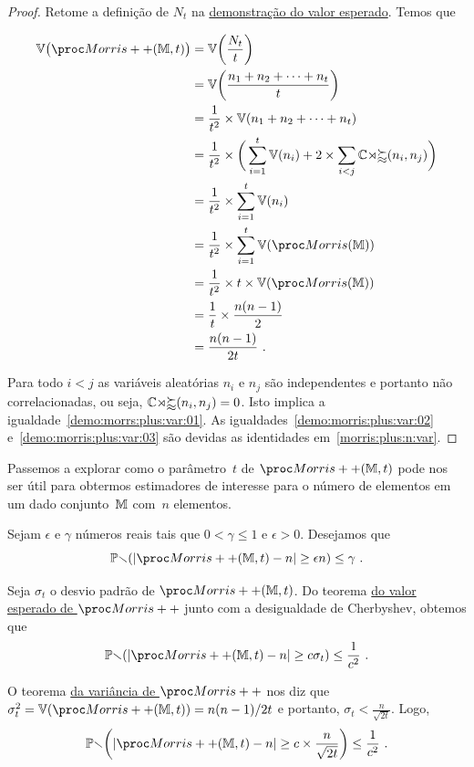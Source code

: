 \begin{proof}
  Retome a definição de $N_t$ na \hyperref[demo:morris:plus]{demonstração do valor esperado}. Temos que

  \begin{align}
    \Vbb\big(\Morrispp(\Mbb,t)\big) & = \Vbb\bigg(\frac{N_t}{t}\bigg) \nonumber\\
    & = \Vbb\bigg(\frac{n_1 + n_2 + \dots +n_t}{t} \bigg) \nonumber\\
    &= \frac{1}{t^2} \times \Vbb(n_1 + n_2 + \dots + n_t)  \nonumber\\
    &= \frac{1}{t^2} \times \bigg(\sum_{i=1}^t\Vbb(n_i) + 2\times \sum_{i<j}\Cov(n_i,n_j)\bigg)\\
    &= \frac{1}{t^2} \times \sum_{i=1}^t\Vbb(n_i) \label{demo:morrs:plus:var:01}\\
    &= \frac{1}{t^2} \times \sum_{i=1}^t\Vbb(\Morris(\Mbb)) \label{demo:morris:plus:var:02} \\
    &= \frac{1}{t^2} \times t \times \Vbb(\Morris(\Mbb)) \nonumber\\
    &= \frac{1}{t} \times \frac{n(n-1)}{2} \label{demo:morris:plus:var:03}\\
    &= \frac{n(n-1)}{2t}\ . \nonumber
  \end{align}
  
  Para todo $i < j$ as variáveis aleatórias $n_i$ e $n_j$ são independentes e portanto não correlacionadas,
  ou seja, $\mathbb{Cov}(n_i,n_j) = 0$. Isto implica a igualdade~\eqref{demo:morrs:plus:var:01}.
  As igualdades~\eqref{demo:morris:plus:var:02} e~\eqref{demo:morris:plus:var:03} são devidas as identidades 
  em~\eqref{morris:plus:n:var}.
\end{proof}

Passemos a explorar como o parâmetro~$t$ de $\Morrispp(\Mbb,t)$ pode nos ser útil para obtermos estimadores de interesse
para o número de elementos em um dado conjunto~$\mathbb{M}$ com~$n$ elementos.

Sejam $\epsilon$ e $\gamma$ números reais tais que $0 < \gamma \leq 1$ e $\epsilon > 0$. Desejamos que
\[ \Pbb(|\Morrispp(\Mbb,t)-n| \geq \epsilon n) \leq \gamma \ . \]

Seja $\sigma_t$ o desvio padrão de $\Morrispp(\Mbb,t)$. Do teorema 
\hyperref[morris:plus:expected_value]{do valor esperado de $\Morrispp$} junto com a desigualdade de Cherbyshev, obtemos 
que
\[ \Pbb(|\Morrispp(\Mbb,t)-n| \geq c\sigma_t) \leq \frac{1}{c^2} \ . \]

O teorema \hyperref[morris:plus:variance]{da variância de $\Morrispp$} nos diz que 
$\sigma^2_t = \Vbb(\Morrispp(\Mbb, t)) = n(n-1)/2t$ e portanto, $\sigma_t < \frac{n}{\sqrt{2t}}$. Logo, 
\begin{align}
  \Pbb\bigg(|\Morrispp(\Mbb,t)-n| \geq c \times \frac{n}{\sqrt{2t}}\bigg) \leq \frac{1}{c^2} \ . 
  \label{morris:plus:prob:01}
\end{align}

